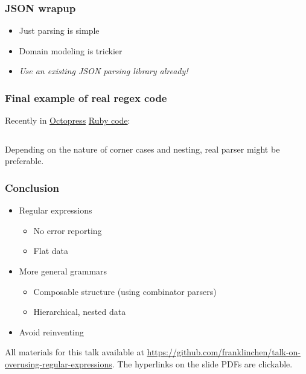 \begin{frame}
  \frametitle{JSON wrapup}

  \begin{itemize}
    \item<1-> Just parsing is simple
    \item<2-> Domain modeling is trickier
    \item<3-> \emph{Use an existing JSON parsing library already!} 
  \end{itemize}
\end{frame}

\begin{frame}[fragile]
  \frametitle{Final example of real regex code}

  Recently in \href{http://octopress.org/}{Octopress} \href{https://github.com/imathis/octopress/blob/3bb4a14212b226d1da3acd546584d7117557a1ae/lib/octopress/liquid\_helpers/conditional.rb}{Ruby code}:

  \inputminted{ruby}{extra/conditional.rb}

  Depending on the nature of corner cases and nesting, real parser might be preferable.
\end{frame}


\begin{frame}
  \frametitle{Conclusion}

  \begin{itemize}
    \item Regular expressions
      \begin{itemize}
        \item No error reporting
        \item Flat data
      \end{itemize}
    \item More general grammars
      \begin{itemize}
        \item Composable structure (using combinator parsers)
        \item Hierarchical, nested data
      \end{itemize}
    \item Avoid reinventing
  \end{itemize}

  All materials for this talk available at \url{https://github.com/franklinchen/talk-on-overusing-regular-expressions}. The hyperlinks on the slide PDFs are clickable.
\end{frame}


